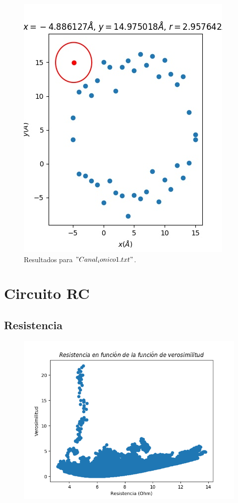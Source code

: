 \documentclass[12pt,letterpaper]{article}
\begin{document}
\begin{figure}[H]
\includegraphics{canal1.jpg}
\caption{Resultados para $"Canal_ionico1.txt"$.}
\centering
\end{figure}



\section{Circuito RC}

\subsection*{Resistencia}
\begin{figure}[H]
\includegraphics{r_verosimilitud.png}
\centering
\end{figure}
\end{document}
